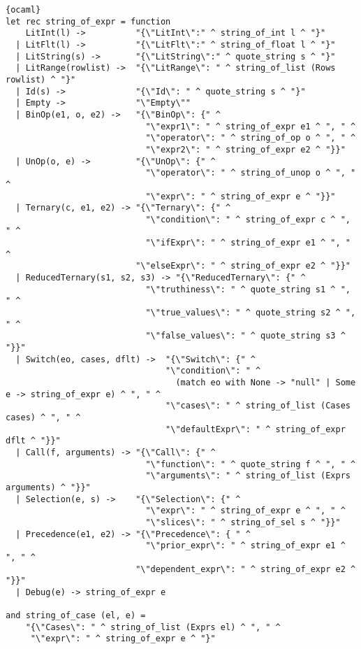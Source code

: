\begin{lstlisting}{ocaml}
let rec string_of_expr = function
    LitInt(l) ->          "{\"LitInt\":" ^ string_of_int l ^ "}"
  | LitFlt(l) ->          "{\"LitFlt\":" ^ string_of_float l ^ "}"
  | LitString(s) ->       "{\"LitString\":" ^ quote_string s ^ "}"
  | LitRange(rowlist) ->  "{\"LitRange\": " ^ string_of_list (Rows rowlist) ^ "}"
  | Id(s) ->              "{\"Id\": " ^ quote_string s ^ "}"
  | Empty ->              "\"Empty\""
  | BinOp(e1, o, e2) ->   "{\"BinOp\": {" ^
                            "\"expr1\": " ^ string_of_expr e1 ^ ", " ^
                            "\"operator\": " ^ string_of_op o ^ ", " ^
                            "\"expr2\": " ^ string_of_expr e2 ^ "}}"
  | UnOp(o, e) ->         "{\"UnOp\": {" ^
                            "\"operator\": " ^ string_of_unop o ^ ", " ^
                            "\"expr\": " ^ string_of_expr e ^ "}}"
  | Ternary(c, e1, e2) -> "{\"Ternary\": {" ^
                            "\"condition\": " ^ string_of_expr c ^ ", " ^
                            "\"ifExpr\": " ^ string_of_expr e1 ^ ", " ^
                          "\"elseExpr\": " ^ string_of_expr e2 ^ "}}"
  | ReducedTernary(s1, s2, s3) -> "{\"ReducedTernary\": {" ^
                            "\"truthiness\": " ^ quote_string s1 ^ ", " ^
                            "\"true_values\": " ^ quote_string s2 ^ ", " ^
                            "\"false_values\": " ^ quote_string s3 ^ "}}"
  | Switch(eo, cases, dflt) ->  "{\"Switch\": {" ^
                                "\"condition\": " ^
                                  (match eo with None -> "null" | Some e -> string_of_expr e) ^ ", " ^
                                "\"cases\": " ^ string_of_list (Cases cases) ^ ", " ^
                                "\"defaultExpr\": " ^ string_of_expr dflt ^ "}}"
  | Call(f, arguments) -> "{\"Call\": {" ^
                            "\"function\": " ^ quote_string f ^ ", " ^
                            "\"arguments\": " ^ string_of_list (Exprs arguments) ^ "}}"
  | Selection(e, s) ->    "{\"Selection\": {" ^
                            "\"expr\": " ^ string_of_expr e ^ ", " ^
                            "\"slices\": " ^ string_of_sel s ^ "}}"
  | Precedence(e1, e2) -> "{\"Precedence\": { " ^
                            "\"prior_expr\": " ^ string_of_expr e1 ^ ", " ^
                          "\"dependent_expr\": " ^ string_of_expr e2 ^ "}}"
  | Debug(e) -> string_of_expr e

and string_of_case (el, e) =
    "{\"Cases\": " ^ string_of_list (Exprs el) ^ ", " ^
     "\"expr\": " ^ string_of_expr e ^ "}"


\end{lstlisting}
